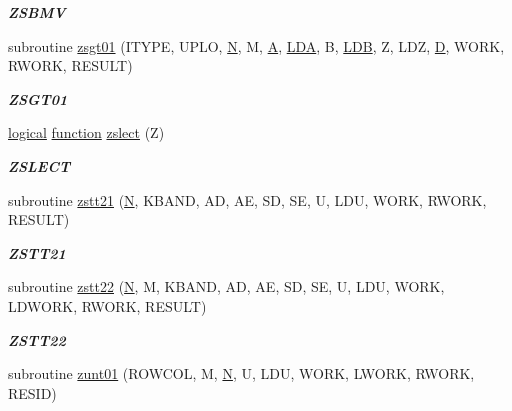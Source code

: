 \begin{DoxyCompactItemize}
\begin{DoxyCompactList}\small\item\em {\bfseries Z\+S\+B\+M\+V} \end{DoxyCompactList}\item 
subroutine \hyperlink{group__complex16__eig_ga96a59c0d9bd47e0ed39035f813b7b684}{zsgt01} (I\+T\+Y\+P\+E, U\+P\+L\+O, \hyperlink{polmisc_8c_a0240ac851181b84ac374872dc5434ee4}{N}, M, \hyperlink{classA}{A}, \hyperlink{example__user_8c_ae946da542ce0db94dced19b2ecefd1aa}{L\+D\+A}, B, \hyperlink{example__user_8c_a50e90a7104df172b5a89a06c47fcca04}{L\+D\+B}, Z, L\+D\+Z, \hyperlink{odrpack_8h_a7dae6ea403d00f3687f24a874e67d139}{D}, W\+O\+R\+K, R\+W\+O\+R\+K, R\+E\+S\+U\+L\+T)
\begin{DoxyCompactList}\small\item\em {\bfseries Z\+S\+G\+T01} \end{DoxyCompactList}\item 
\hyperlink{tnc_8c_aa7b64cdf39500931f7b333343791a104}{logical} \hyperlink{afunc_8m_a7b5e596df91eadea6c537c0825e894a7}{function} \hyperlink{group__complex16__eig_ga5f37daf9fec134eae34b3575fff5e7c6}{zslect} (Z)
\begin{DoxyCompactList}\small\item\em {\bfseries Z\+S\+L\+E\+C\+T} \end{DoxyCompactList}\item 
subroutine \hyperlink{group__complex16__eig_ga648d5fcaa302d5769d588aaa6f736fe8}{zstt21} (\hyperlink{polmisc_8c_a0240ac851181b84ac374872dc5434ee4}{N}, K\+B\+A\+N\+D, A\+D, A\+E, S\+D, S\+E, U, L\+D\+U, W\+O\+R\+K, R\+W\+O\+R\+K, R\+E\+S\+U\+L\+T)
\begin{DoxyCompactList}\small\item\em {\bfseries Z\+S\+T\+T21} \end{DoxyCompactList}\item 
subroutine \hyperlink{group__complex16__eig_ga06f5cd0527f88e4aed3bdbf084d050a9}{zstt22} (\hyperlink{polmisc_8c_a0240ac851181b84ac374872dc5434ee4}{N}, M, K\+B\+A\+N\+D, A\+D, A\+E, S\+D, S\+E, U, L\+D\+U, W\+O\+R\+K, L\+D\+W\+O\+R\+K, R\+W\+O\+R\+K, R\+E\+S\+U\+L\+T)
\begin{DoxyCompactList}\small\item\em {\bfseries Z\+S\+T\+T22} \end{DoxyCompactList}\item 
subroutine \hyperlink{group__complex16__eig_gac8d92ee1ea8c00830b42ebf4017a2ae3}{zunt01} (R\+O\+W\+C\+O\+L, M, \hyperlink{polmisc_8c_a0240ac851181b84ac374872dc5434ee4}{N}, U, L\+D\+U, W\+O\+R\+K, L\+W\+O\+R\+K, R\+W\+O\+R\+K, R\+E\+S\+I\+D)

\end{DoxyCompactItemize}
